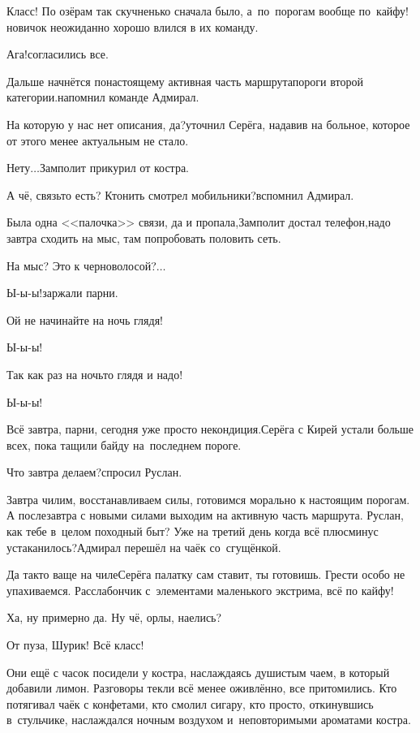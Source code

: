 \diagdash Класс! По озёрам так скучненько сначала было, а~по~порогам вообще по~кайфу!\mdash новичок неожиданно хорошо влился в их команду.

\diagdash Ага!\mdash согласились все.

\diagdash Дальше начнётся по\sdash настоящему активная часть маршрута\mdash пороги второй категории.\mdash напомнил команде Адмирал.

\diagdash На которую у нас нет описания, да?\mdash уточнил Серёга, надавив на больное, которое от этого менее актуальным не стало.

\diagdash Нету$\ldots$\mdash Замполит прикурил от костра.

\diagdash А чё, связь\sdash то есть? Кто\sdash нить смотрел мобильники?\mdash вспомнил Адмирал.

\diagdash Была одна <<палочка>> связи, да и пропала,\mdash Замполит достал телефон,\mdash надо завтра сходить на мыс, там попробовать половить сеть.

\diagdash На мыс? Это к черноволосой?$\ldots$

\diagdash Ы-ы-ы!\mdash заржали парни.

\diagdash Ой не начинайте на ночь глядя!

\diagdash Ы-ы-ы!

\diagdash Так как раз на ночь\sdash то глядя и надо!

\diagdash Ы-ы-ы!

\diagdash Всё завтра, парни, сегодня уже просто некондиция.\mdash Серёга с Кирей устали больше всех, пока тащили байду на~последнем пороге.

\diagdash Что завтра делаем?\mdash спросил Руслан.

\diagdash Завтра чилим, восстанавливаем силы, готовимся морально к настоящим порогам. А послезавтра с новыми силами выходим на активную часть маршрута. Руслан, как тебе в~целом походный быт? Уже на третий  день когда всё плюс\sdash минус устаканилось?\mdash Адмирал перешёл на чаёк со~сгущёнкой.

\diagdash Да так\sdash то ваще на чиле\mdash Серёга палатку сам ставит, ты готовишь. Грести особо не упахиваемся. Расслабончик с~элементами маленького экстрима, всё по кайфу!

\diagdash Ха, ну примерно да. Ну чё, орлы, наелись?

\diagdash От пуза, Шурик! Всё класс!

Они ещё с часок посидели у костра, наслаждаясь душистым чаем, в который добавили лимон. Разговоры текли всё менее оживлённо, все притомились. Кто потягивал чаёк с конфетами, кто смолил сигару, кто просто, откинувшись в~стульчике, наслаждался ночным воздухом и~неповторимыми ароматами костра.

